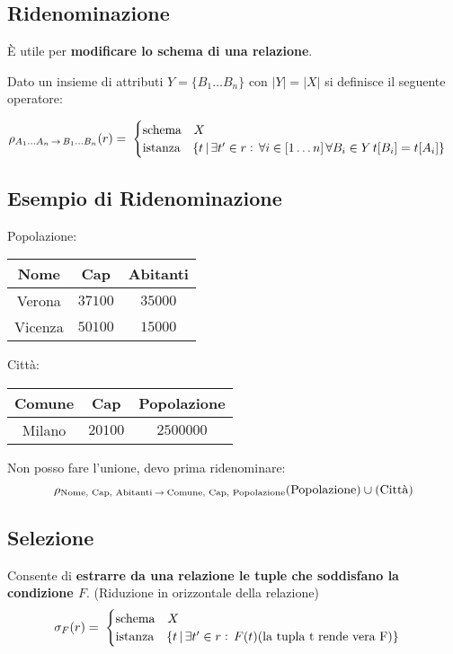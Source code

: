\documentclass[a4paper, 10pt]{article}
\theoremstyle{definition}
\begin{document}
			\subsection*{Ridenominazione}
			 È utile per \textbf{modificare lo schema di una relazione}.

			Dato un insieme di attributi $ Y = \{ B_1 \dots B_n \}$ con $|Y| = |X|$
			si definisce il seguente operatore:

			\[ 
				\rho_{A_1 \dots A_n \, \rightarrow \, B_1 \dots B_n} (r) = \;
				\begin{cases}
					\textup{schema} \quad X \\
					\textup{istanza} \quad \{ t \, | \, \exists t' \in r : \, \forall i \in [ 1 \dots n] \, \forall B_i \in Y \, t[B_i] = t[A_i]  \}
				\end{cases}
			\]

		\newpage
		
		\subsection*{Esempio di Ridenominazione}
		
		\begin{multicols}{2}
			Popolazione:
			
			\begin{tabular}{ccc}
				\toprule
				\textbf{Nome} & \textbf{Cap} & \textbf{Abitanti} \\
				\midrule
				Verona & $37100$ & $35000$  \\
				Vicenza & $50100$ & $15000$
			\end{tabular}
			
			\columnbreak
			
			Città:
			
			\begin{tabular}{ccc}
				\toprule
				\textbf{Comune} & \textbf{Cap} & \textbf{Popolazione} \\
				\midrule
				Milano & $20100$ & $2500000$
			\end{tabular}
		\end{multicols}
		
		Non posso fare l'unione, devo prima ridenominare:
		\[
			\rho_{\textup{Nome, Cap, Abitanti} \: \rightarrow \: \textup{Comune, Cap, Popolazione}}
			(\textup{Popolazione}) \cup (\textup{Città})
		\]
		
		\subsection*{Selezione}
			Consente di \textbf{estrarre da una relazione le tuple che soddisfano
			la condizione $F$}. (Riduzione in orizzontale della relazione)
			\[
				\sigma_{F}(r) = \;
				\begin{cases}
					\textup{schema} \quad X \\
					\textup{istanza} \quad \{ t \, | \, \exists t' \in r : \, F(t) (\textup{la tupla t rende vera F})  \}
				\end{cases}
			\]
		
\end{document}

